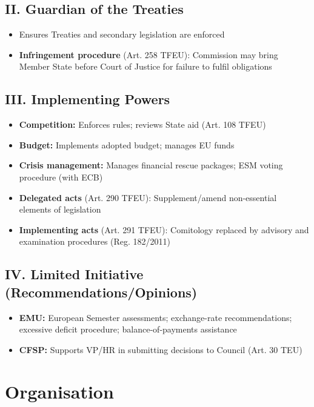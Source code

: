 \documentclass[11pt,a4paper]{article}
\begin{document}
\subsection*{II. Guardian of the Treaties}

\begin{itemize}
\item Ensures Treaties and secondary legislation are enforced
\item \textbf{Infringement procedure} (Art. 258 TFEU): Commission may bring Member State before Court of Justice for failure to fulfil obligations
\end{itemize}

\subsection*{III. Implementing Powers}

\begin{itemize}
\item \textbf{Competition:} Enforces rules; reviews State aid (Art. 108 TFEU)
\item \textbf{Budget:} Implements adopted budget; manages EU funds
\item \textbf{Crisis management:} Manages financial rescue packages; ESM voting procedure (with ECB)
\item \textbf{Delegated acts} (Art. 290 TFEU): Supplement/amend non-essential elements of legislation
\item \textbf{Implementing acts} (Art. 291 TFEU): Comitology replaced by advisory and examination procedures (Reg. 182/2011)
\end{itemize}

\subsection*{IV. Limited Initiative (Recommendations/Opinions)}

\begin{itemize}
\item \textbf{EMU:} European Semester assessments; exchange-rate recommendations; excessive deficit procedure; balance-of-payments assistance
\item \textbf{CFSP:} Supports VP/HR in submitting decisions to Council (Art. 30 TEU)
\end{itemize}

\section*{Organisation}
\end{document}
